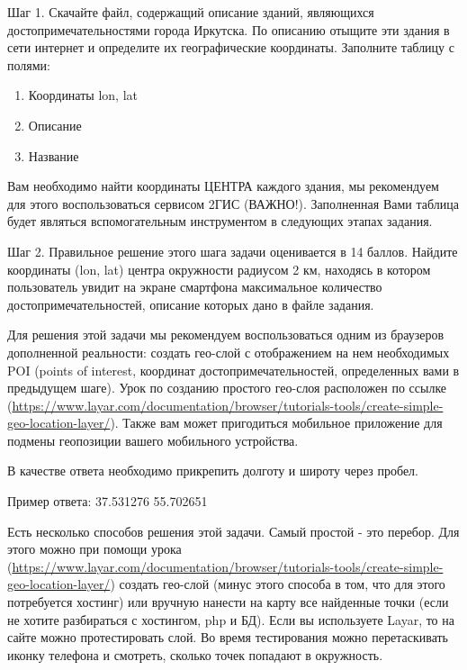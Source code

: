 
Шаг 1. Скачайте файл, содержащий описание зданий, являющихся достопримечательностями города Иркутска. По описанию отыщите эти здания в сети интернет и определите их географические координаты. Заполните таблицу с полями:

\begin{enumerate}
    \item Координаты lon, lat
    \item Описание
    \item Название
\end{enumerate}

Вам необходимо найти координаты ЦЕНТРА каждого здания, мы рекомендуем для этого воспользоваться сервисом 2ГИС (ВАЖНО!). Заполненная Вами таблица будет являться вспомогательным инструментом в следующих этапах задания.

Шаг 2. Правильное решение этого шага задачи оценивается в 14 баллов. Найдите координаты (lon, lat) 
центра окружности радиусом 2 км, находясь в котором пользователь увидит на экране смартфона максимальное 
количество достопримечательностей, описание которых дано в файле задания.  

Для решения этой задачи мы рекомендуем воспользоваться одним из браузеров дополненной реальности: 
создать гео-слой с отображением на нем необходимых POI (points of interest, координат достопримечательностей, 
определенных вами в предыдущем шаге). Урок по созданию простого гео-слоя расположен по ссылке (\url{https://www.layar.com/documentation/browser/tutorials-tools/create-simple-geo-location-layer/}). Также вам может пригодиться мобильное приложение для подмены геопозиции вашего мобильного устройства.

В качестве ответа необходимо прикрепить долготу и широту через пробел.

Пример ответа:  37.531276 55.702651

\solutionSection

Есть несколько способов решения этой задачи. Самый простой - это перебор. Для этого можно при помощи урока (\url{https://www.layar.com/documentation/browser/tutorials-tools/create-simple-geo-location-layer/}) создать гео-слой (минус этого способа в том, что для этого потребуется хостинг) или вручную нанести на карту все найденные точки (если не хотите разбираться с хостингом, php и БД). Если вы используете Layar, то на сайте можно протестировать слой. Во время тестирования можно перетаскивать иконку телефона и смотреть, сколько точек попадают в окружность.

